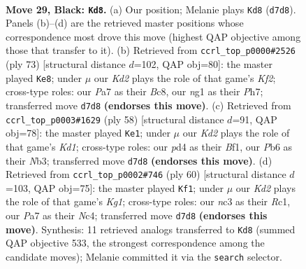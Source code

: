 \documentclass[11pt]{article}
\begin{document}
\clearpage

\begin{figure}[p]\centering
\begin{subfigure}{0.46\textwidth}\centering
\resizebox{\linewidth}{!}{%
\newchessgame
\chessboard[
  setfen={r7/pp1k4/np2Q1p1/1P1pP3/1P1P4/2N4B/8/4K1N1 b - - 0 29},
  showmover=false,
  pgfstyle=straightmove, color=movearrow, markmove={d7-d8}
]}
\caption{}
\end{subfigure}\hfill
\begin{subfigure}{0.46\textwidth}\centering
\resizebox{\linewidth}{!}{%
\newchessgame
\chessboard[
  setfen={2b5/5k1p/p4Q2/1q3Pp1/1p5P/1P6/P1P5/BK1n4 b - - 0 37},
  showmover=false,
  pgfstyle=straightmove, color=movearrow, markmove={f7-e8}
]}
\caption{}
\end{subfigure}
\\[4pt]
\begin{subfigure}{0.46\textwidth}\centering
\resizebox{\linewidth}{!}{%
\newchessgame
\chessboard[
  setfen={4kb1R/5pp1/p3n3/6P1/1p2b3/1N2Q3/PPq5/3K1B2 w - - 3 30},
  showmover=false,
  pgfstyle=straightmove, color=movearrow, markmove={d1-e1}
]}
\caption{}
\end{subfigure}\hfill
\begin{subfigure}{0.46\textwidth}\centering
\resizebox{\linewidth}{!}{%
\newchessgame
\chessboard[
  setfen={1k6/1p4p1/p1p3Q1/8/PPN3nr/7P/5PPq/2R3K1 w - - 5 31},
  showmover=false,
  pgfstyle=straightmove, color=movearrow, markmove={g1-f1}
]}
\caption{}
\end{subfigure}
\caption{\textbf{Move 29, Black: \texttt{Kd8}.} (a) Our position; Melanie plays \texttt{Kd8} (\texttt{d7d8}). Panels (b)--(d) are the retrieved master positions whose correspondence most drove this move (highest QAP objective among those that transfer to it). (b) Retrieved from \texttt{ccrl\_top\_p0000\#2526} (ply 73) [structural distance $d$=102, QAP obj=80]: the master played \texttt{Ke8}; under $\mu$ our \emph{Kd2} plays the role of that game's \emph{Kf2}; cross-type roles: our \emph{P}a7 as their \emph{B}c8, our \emph{n}g1 as their \emph{P}h7; transferred move \texttt{d7d8} \textbf{(endorses this move)}. (c) Retrieved from \texttt{ccrl\_top\_p0003\#1629} (ply 58) [structural distance $d$=91, QAP obj=78]: the master played \texttt{Ke1}; under $\mu$ our \emph{Kd2} plays the role of that game's \emph{Kd1}; cross-type roles: our \emph{p}d4 as their \emph{B}f1, our \emph{P}b6 as their \emph{N}b3; transferred move \texttt{d7d8} \textbf{(endorses this move)}. (d) Retrieved from \texttt{ccrl\_top\_p0002\#746} (ply 60) [structural distance $d$=103, QAP obj=75]: the master played \texttt{Kf1}; under $\mu$ our \emph{Kd2} plays the role of that game's \emph{Kg1}; cross-type roles: our \emph{n}c3 as their \emph{R}c1, our \emph{P}a7 as their \emph{N}c4; transferred move \texttt{d7d8} \textbf{(endorses this move)}. Synthesis: 11 retrieved analogs transferred to \texttt{Kd8} (summed QAP objective 533, the strongest correspondence among the candidate moves); Melanie committed it via the \texttt{search} selector.}
\label{fig:thought-m57}
\end{figure}
\end{document}
